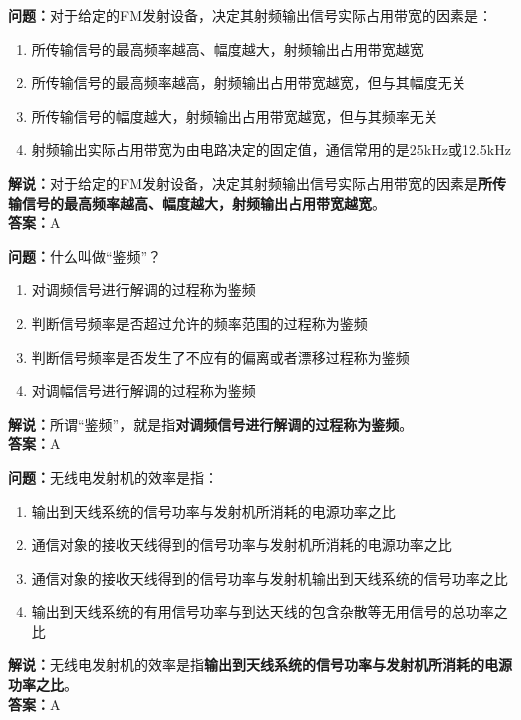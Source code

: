 \textbf{问题：}对于给定的FM发射设备，决定其射频输出信号实际占用带宽的因素是：

\begin{enumerate}[label=\Alph*), leftmargin=1.5cm]
	\item 所传输信号的最高频率越高、幅度越大，射频输出占用带宽越宽
	\item 所传输信号的最高频率越高，射频输出占用带宽越宽，但与其幅度无关
	\item 所传输信号的幅度越大，射频输出占用带宽越宽，但与其频率无关
	\item 射频输出实际占用带宽为由电路决定的固定值，通信常用的是25kHz或12.5kHz
\end{enumerate}

\textbf{解说：}对于给定的FM发射设备，决定其射频输出信号实际占用带宽的因素是\textbf{所传输信号的最高频率越高、幅度越大，射频输出占用带宽越宽}。\\\textbf{答案：}A%



\textbf{问题：}什么叫做“鉴频”？

\begin{enumerate}[label=\Alph*), leftmargin=1.5cm]
	\item 对调频信号进行解调的过程称为鉴频
	\item 判断信号频率是否超过允许的频率范围的过程称为鉴频
	\item 判断信号频率是否发生了不应有的偏离或者漂移过程称为鉴频
	\item 对调幅信号进行解调的过程称为鉴频
\end{enumerate}

\textbf{解说：}所谓“鉴频”，就是指\textbf{对调频信号进行解调的过程称为鉴频}。\\\textbf{答案：}A%



\textbf{问题：}无线电发射机的效率是指：

\begin{enumerate}[label=\Alph*), leftmargin=1.5cm]
	\item 输出到天线系统的信号功率与发射机所消耗的电源功率之比
	\item 通信对象的接收天线得到的信号功率与发射机所消耗的电源功率之比
	\item 通信对象的接收天线得到的信号功率与发射机输出到天线系统的信号功率之比
	\item 输出到天线系统的有用信号功率与到达天线的包含杂散等无用信号的总功率之比
\end{enumerate}

\textbf{解说：}无线电发射机的效率是指\textbf{输出到天线系统的信号功率与发射机所消耗的电源功率之比}。\\\textbf{答案：}A%



